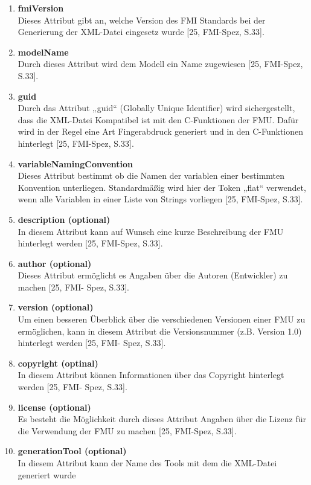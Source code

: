 \begin{enumerate}
	\item \textbf{fmiVersion} \\
	Dieses Attribut gibt an, welche Version des FMI Standards bei der Generierung der XML-Datei
	eingesetz wurde [25, FMI-Spez, S.33].
	\item \textbf{modelName} \\
	Durch dieses Attribut wird dem Modell ein Name zugewiesen [25, FMI-Spez, S.33].
	\item \textbf{guid} \\
	Durch das Attribut „guid“ (Globally Unique Identifier) wird sichergestellt, dass die XML-Datei 
	Kompatibel ist mit den C-Funktionen der FMU. Dafür wird in der Regel eine Art Fingerabdruck
	generiert und in den C-Funktionen hinterlegt [25, FMI-Spez, S.33].
	\item \textbf{variableNamingConvention} \\
	Dieses Attribut bestimmt ob die Namen der variablen einer bestimmten Konvention 
	unterliegen. Standardmäßig wird hier der Token „flat“ verwendet, wenn alle Variablen
	in einer Liste von Strings vorliegen [25, FMI-Spez, S.33].
	\item \textbf{description (optional)} \\
	In diesem Attribut kann auf Wunsch eine kurze Beschreibung der FMU hinterlegt werden [25, 
	FMI-Spez, S.33].
	\item \textbf{author (optional)} \\
	Dieses Attribut ermöglicht es Angaben über die Autoren (Entwickler) zu machen [25, FMI-
	Spez, S.33].
	\item \textbf{version (optional)} \\
	Um einen besseren Überblick über die verschiedenen Versionen einer FMU zu ermöglichen,
	kann in diesem Attribut die Versionsnummer (z.B. Version 1.0) hinterlegt werden [25, FMI-
	Spez, S.33].
	\item \textbf{copyright (optinal)} \\
	In diesem Attribut können Informationen über das Copyright hinterlegt werden [25, FMI-
	Spez, S.33].
	\item \textbf{license (optional)} \\
	Es besteht die Möglichkeit durch dieses Attribut Angaben über die Lizenz für die Verwendung
	der FMU zu machen [25, FMI-Spez, S.33].
	\item \textbf{generationTool (optional)} \\
	In diesem Attribut kann der Name des Tools mit dem die XML-Datei generiert wurde

\end{enumerate}
